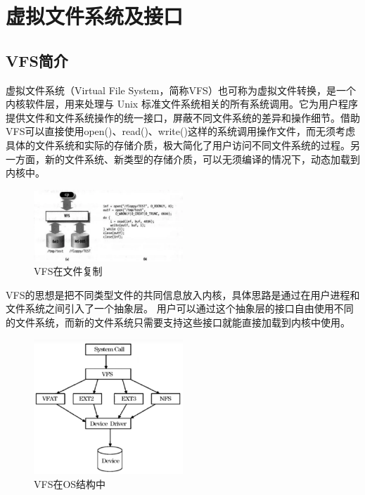 \section{虚拟文件系统及接口}

\subsection{VFS简介}
虚拟文件系统（Virtual File System，简称VFS）也可称为虚拟文件转换，是一个内核软件层，用来处理与 Unix 标准文件系统相关的所有系统调用。它为用户程序提供文件和文件系统操作的统一接口，屏蔽不同文件系统的差异和操作细节。借助VFS可以直接使用open()、read()、write()这样的系统调用操作文件，而无须考虑具体的文件系统和实际的存储介质，极大简化了用户访问不同文件系统的过程。另一方面，新的文件系统、新类型的存储介质，可以无须编译的情况下，动态加载到内核中。

\begin{figure}[ht]
	\centering
	\includegraphics[width=0.5\textwidth]{figures/07-08-VFS-in-file-copy.png}
	\caption{VFS在文件复制}
	
\end{figure}

VFS的思想是把不同类型文件的共同信息放入内核，具体思路是通过在用户进程和文件系统之间引入了一个抽象层。
用户可以通过这个抽象层的接口自由使用不同的文件系统，而新的文件系统只需要支持这些接口就能直接加载到内核中使用。

\begin{figure}[ht]
	\centering
	\includegraphics[width=0.5\textwidth]{figures/07-08-VFS-in-OS.png}
	\caption{VFS在OS结构中}
	
\end{figure}

